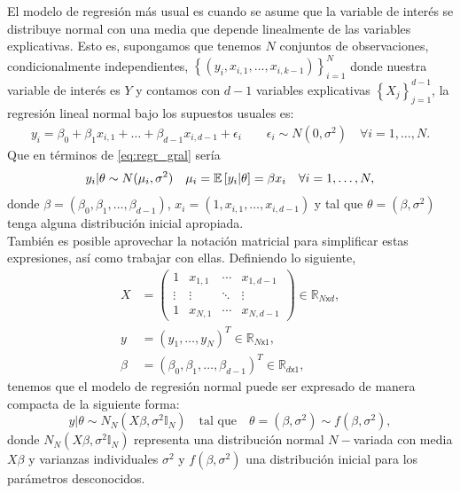 El modelo de regresión más usual es cuando se asume que la variable de interés se distribuye normal con una media que depende linealmente de las variables explicativas. Esto es, supongamos que tenemos $N$ conjuntos de observaciones, condicionalmente independientes, $\left\lbrace(y_i,x_{i,1},\dots,x_{i,k-1})\right\rbrace_{i=1}^{N}$ donde nuestra variable de interés es $Y$ y contamos con $d-1$ variables explicativas $\left\lbrace X_j\right\rbrace_{j=1}^{d-1}$, la regresión lineal normal bajo los supuestos usuales es: 
\begin{align*} 
y_i = \beta_0 + \beta_1 x_{i,1} + \dots + \beta_{d-1} x_{i,d-1} + \epsilon_i \qquad \epsilon_i \sim N(0,\sigma^2) \quad \forall i = 1,\dots, N. 
\end{align*}
Que en términos de \eqref{eq:regr_gral} sería
\begin{equation*}
y_i|\theta \sim N(\mu_i,\sigma^2) \quad \mu_i = \mathbb{E}\left[ y_i|\theta \right] = \beta x_i \quad \forall i = 1, \dots, N,
\end{equation*}
donde $\beta = (\beta_0,\beta_1,\dots,\beta_{d-1})$, $x_i = (1,x_{i,1},\dots,x_{i,d-1})$ y tal que  $\theta = (\beta,\sigma^2)$ tenga alguna distribución inicial apropiada.\\ 

También es posible aprovechar la notación matricial para simplificar estas expresiones, así como trabajar con ellas. Definiendo lo siguiente,  
\begin{align*}
X &= 
\begin{pmatrix}
  1 & x_{1,1} & \cdots & x_{1,d-1} \\
  \vdots & \vdots & \ddots & \vdots  \\
  1 & x_{N,1} & \cdots & x_{N,d-1} 
\end{pmatrix} \in \mathbb{R}_{N\mathsf{x}d}, \\
y &= (y_1,\dots,y_N)^T \in \mathbb{R}_{N\mathsf{x}1},\\
\beta &= (\beta_0,\beta_1,\dots,\beta_{d-1})^T \in \mathbb{R}_{d\mathsf{x}1}, 
\end{align*}
tenemos que el modelo de regresión normal puede ser expresado de manera compacta de la siguiente forma: 
\begin{equation*}
y|\theta \sim N_N(X\beta,\sigma^2\mathbb{I}_N) \quad \text{tal que} \quad \theta = (\beta, \sigma^2) \sim f(\beta,\sigma^2), 
\end{equation*} 
donde $N_N(X\beta,\sigma^2\mathbb{I}_N)$ representa una distribución normal $N-$variada con media $X\beta$ y varianzas individuales $\sigma^2$ y $f(\beta,\sigma^2)$ una distribución inicial para los parámetros desconocidos. 

